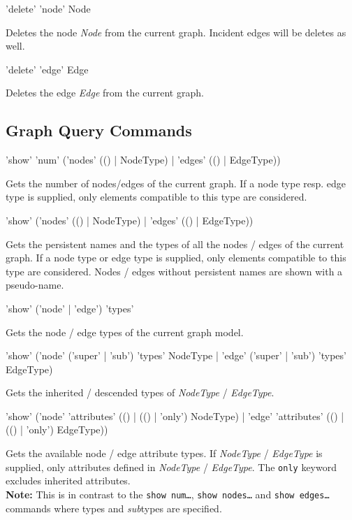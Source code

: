 \documentclass[a4paper,11pt]{report}
\begin{document}
\begin{rail}
  'delete' 'node' Node
\end{rail}
Deletes the node \emph{Node} from the current graph. Incident edges will be deletes as well.

\begin{rail}
  'delete' 'edge' Edge
\end{rail}
Deletes the edge \emph{Edge} from the current graph.  
  
\subsection{Graph Query Commands}

\begin{rail}
  'show' 'num' ('nodes' (() | NodeType) | 'edges' (() | EdgeType))
\end{rail}
Gets the number of nodes/edges of the current graph. If a node type resp. edge type is supplied, only elements compatible to this type are considered.

\begin{rail}
  'show' ('nodes' (() | NodeType) | 'edges' (() | EdgeType))
\end{rail}
Gets the persistent names and the types of all the nodes / edges of the current graph. If a node type or edge type is supplied, only elements compatible to this type are considered. Nodes / edges without persistent names are shown with a pseudo-name.

\begin{rail}
  'show' ('node' | 'edge') 'types'
\end{rail}
Gets the node / edge types of the current graph model.

\begin{rail}
'show' ('node' ('super' | 'sub') 'types' NodeType | 'edge' ('super' | 'sub') 'types' EdgeType)
\end{rail}
Gets the inherited / descended types of \emph{NodeType} / \emph{EdgeType}.

\begin{rail}
  'show' ('node' 'attributes' (() | (() | 'only') NodeType) | 'edge' 'attributes' (() | (() | 'only') EdgeType))
\end{rail}
Gets the available node / edge attribute types. If \emph{NodeType} / \emph{EdgeType} is supplied, only attributes defined in \emph{NodeType} / \emph{EdgeType}. The \texttt{only} keyword excludes inherited attributes.\\
\textbf{Note:} This is in contrast to the \texttt{show num\dots}, \texttt{show nodes\dots} and \texttt{show edges\dots} commands where types and \emph{sub}types are specified.
\end{document}
